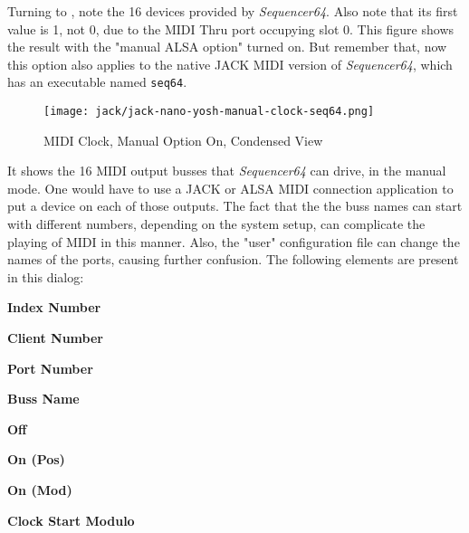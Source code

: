 
%

   Turning to ,
   note the 16 devices provided by
   \textsl{Sequencer64}.  Also note that its first value is 1, not 0, due to
   the MIDI Thru port occupying slot 0.
   This figure shows the result with the "manual ALSA option" turned on.
   But remember that, now this option also applies to the native JACK MIDI
   version of \textsl{Sequencer64}, which has an executable named
   \texttt{seq64}.

\begin{figure}[H]
   \centering 
   \texttt{[image: jack/jack-nano-yosh-manual-clock-seq64.png]}
   \caption{MIDI Clock, Manual Option On, Condensed View}
   \label{fig:seq64_midi_clock_4_devices_manual_1}
\end{figure}

   It shows the 16 MIDI output busses that \textsl{Sequencer64} can
   drive, in the manual mode.  One would have to use a JACK or ALSA MIDI
   connection application to put a device on each of those outputs.  The fact
   that the the buss names can
   start with different numbers, depending on the system setup, can complicate
   the playing of MIDI in this manner.  Also, the "user" configuration file can
   change the names of the ports, causing further confusion.
   The following elements are present in this dialog:

   \begin{enumber}
      \item \textbf{Index Number}
      \item \textbf{Client Number}
      \item \textbf{Port Number}
      \item \textbf{Buss Name}
      \item \textbf{Off}
      \item \textbf{On (Pos)}
      \item \textbf{On (Mod)}
      \item \textbf{Clock Start Modulo}
   \end{enumber}

